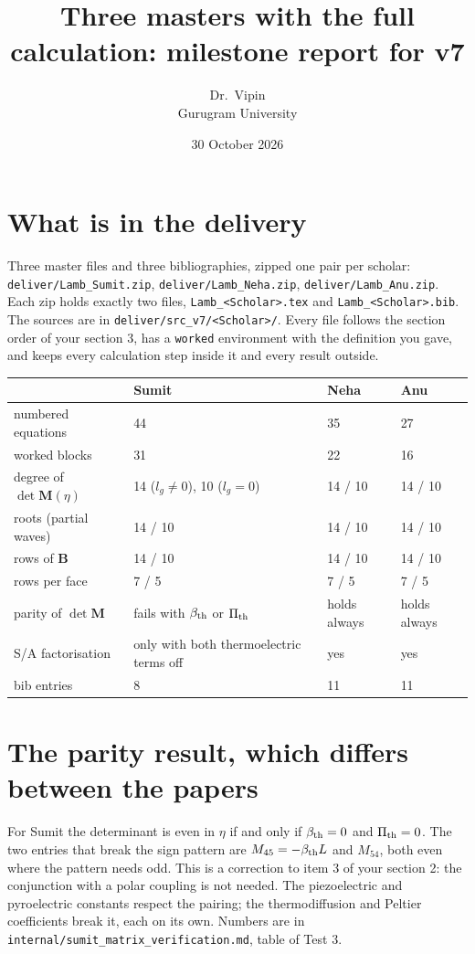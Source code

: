 \documentclass[11pt,a4paper]{article}
\title{\vspace{-1.4cm}\Large Three masters with the full calculation: milestone report for v7}
\author{Dr.\ Vipin\\ Gurugram University}
\date{30 October 2026}
\begin{document}
\maketitle
\vspace{-7mm}

\section*{What is in the delivery}

Three master files and three bibliographies, zipped one pair per scholar:
\texttt{deliver/Lamb\_Sumit.zip}, \texttt{deliver/Lamb\_Neha.zip}, \texttt{deliver/Lamb\_Anu.zip}. Each
zip holds exactly two files, \texttt{Lamb\_<Scholar>.tex} and \texttt{Lamb\_<Scholar>.bib}. The sources are
in \texttt{deliver/src\_v7/<Scholar>/}. Every file follows the section order of your section 3, has a
\texttt{worked} environment with the definition you gave, and keeps every calculation step inside it and
every result outside.

\begin{center}\footnotesize
\begin{tabular}{p{3.4cm}p{3.1cm}p{3.1cm}p{3.1cm}}
\toprule
 & Sumit & Neha & Anu\\
\midrule
numbered equations & 44 & 35 & 27\\
worked blocks & 31 & 22 & 16\\
degree of $\det\mathbf M(\eta)$ & 14 ($l_g\ne0$), 10 ($l_g=0$) & 14 / 10 & 14 / 10\\
roots (partial waves) & 14 / 10 & 14 / 10 & 14 / 10\\
rows of $\mathbf B$ & 14 / 10 & 14 / 10 & 14 / 10\\
rows per face & 7 / 5 & 7 / 5 & 7 / 5\\
parity of $\det\mathbf M$ & fails with $\beta_{\rm th}$ or $\Pi_{\rm th}$ & holds always & holds always\\
S/A factorisation & only with both thermoelectric terms off & yes & yes\\
bib entries & 8 & 11 & 11\\
\bottomrule
\end{tabular}
\end{center}

\section*{The parity result, which differs between the papers}

For Sumit the determinant is even in $\eta$ if and only if $\beta_{\rm th}=0$ and $\Pi_{\rm th}=0$. The two
entries that break the sign pattern are $M_{45}=-\beta_{\rm th}L$ and $M_{54}$, both even where the pattern
needs odd. This is a correction to item 3 of your section 2: the conjunction with a polar coupling is not
needed. The piezoelectric and pyroelectric constants respect the pairing; the thermodiffusion and Peltier
coefficients break it, each on its own. Numbers are in \texttt{internal/sumit\_matrix\_verification.md},
table of Test 3.
\end{document}
